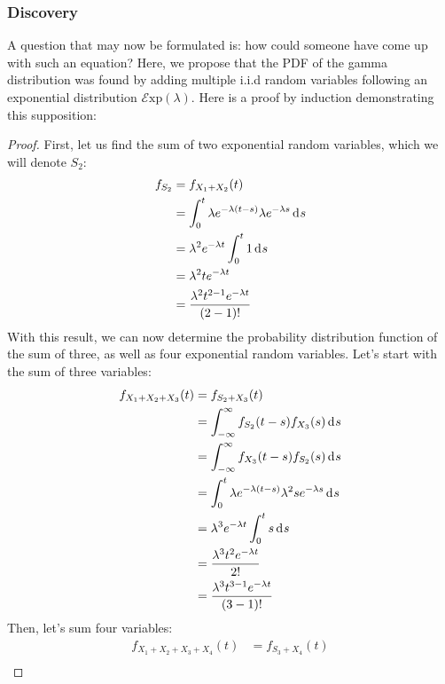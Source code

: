 \documentclass[12pt]{article}
\newcommand{\E}{\mathcal{E}}
\begin{document}
\subsubsection{Discovery }
A question that may now be formulated is: how could someone have come up with such an equation? Here, we propose that
the PDF of the gamma distribution was found by adding multiple i.i.d random variables following an exponential
distribution $\E\text{xp}(\lambda)$. Here is a proof by induction demonstrating this supposition:
\begin{proof}
	First, let us find the sum of two exponential random variables, which we will denote $S_2$:
	\begin{equation}
		\begin{split}
			f_{S_2}	&=	f_{X_1 + X_2} (t)\\
					&=	\int^t_0 \lambda e^{-\lambda(t-s)}\lambda e^{-\lambda s}\mathop{}\!\mathrm{d^{}}s\\
					&=	\lambda^2 e^{-\lambda t}\int^t_0 1\mathop{}\!\mathrm{d^{}}s\\
					&=	\lambda^2 te^{-\lambda t}\\
					&=	\frac{\lambda^2 t^{2-1} e^{-\lambda t}}{(2-1)!}
		\end{split}
	\end{equation}
	With this result, we can now determine the probability distribution function of the sum of three, as well as four
	exponential random variables. Let's start with the sum of three variables:
	\begin{equation}
		\begin{split}
			f_{X_1 + X_2 + X_3}(t)	&=	f_{S_2 + X_3}(t)\\
			 						&=	\int^\infty_{-\infty} f_{S_2}(t-s)f_{X_3}(s)\mathop{}\!\mathrm{d^{}}s\\
			 						&=	\int^\infty_{-\infty} f_{X_3}(t-s)f_{S_2}(s)\mathop{}\!\mathrm{d^{}}s\\
			 						&=	\int^t_0 \lambda e^{-\lambda(t-s)}\lambda^2 s e^{-\lambda s}\mathop{}\!\mathrm{d^{}}s\\
									&=	\lambda^3 e^{-\lambda t} \int^t_0 s\mathop{}\!\mathrm{d^{}}s\\
									&=	\frac{\lambda^3 t^2 e^{-\lambda t}}{2!}\\
									&=	\frac{\lambda^3 t^{3-1} e^{-\lambda t}}{(3-1)!}
		\end{split}
	\end{equation}
	Then, let's sum four variables:
	\begin{equation}
		\begin{split}
			f_{X_1+X_2+X_3+X_4}(t)	&=	f_{S_3+X_4}(t)\\

\end{split}
\end{equation}
\end{proof}
\end{document}
